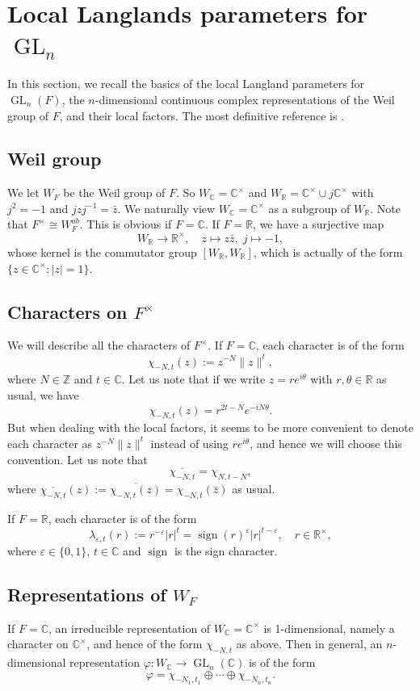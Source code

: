 \documentclass[11pt]{amsart}
\theoremstyle{plain}
\theoremstyle{definition}
\numberwithin{equation}{section}
\newcommand{\C}{\mathbb C}
\newcommand{\Z}{\mathbb{Z}}
\newcommand{\R}{\mathbb{R}}
\newcommand{\la}{\lambda}
\newcommand{\ep}{\varepsilon}
\newcommand{\sign}{\operatorname{sign}}
\newcommand{\ie}{\text{i.e.\ }}
\newcommand{\GL}{\operatorname{GL}}
\begin{document}
\section{Local Langlands parameters for $\GL_n$}


In this section, we recall the basics of the local Langland parameters
for $\GL_n(F)$, \ie the $n$-dimensional continuous complex representations of
the Weil group of $F$, and their local factors. The most definitive reference
is \cite{Tate}.

\subsection{Weil group}
We let $W_F$ be the Weil group of $F$. So $W_\C=\C^\times$ and
$W_\R=\C^\times\cup j\C^\times$ with $j^2=-1$ and
$jzj^{-1}=\bar{z}$. We naturally view $W_\C=\C^\times$ as a subgroup of
$W_\R$. Note that $F^\times\cong W_F^{ab}$. This is obvious if
$F=\C$. If $F=\R$, we have a surjective map
\begin{equation}\label{E:W_R}
W_\R\longrightarrow \R^\times, \quad z\mapsto z\bar{z},\; j\mapsto -1,
\end{equation}
whose kernel is the commutator group $[W_\R, W_\R]$, which is actually of the form
$\{z\in\C^\times:|z|=1\}$.


\subsection{Characters on $F^\times$}
We will describe all the characters of $F^\times$. If $F=\C$,
each character is of the form 
\[
\chi_{-N, t}(z):=z^{-N}\|z\|^t,
\]
where $N\in\Z$ and $t\in\C$.  Let us note that if we write $z=re^{i\theta}$ with $r,
\theta\in\R$ as usual, we have
\[
\chi_{-N,t}(z)=r^{2t-N}e^{-iN\theta}.
\]
But when dealing with the local factors, it seems to be more
convenient to denote each character as $z^{-N}\|z\|^t$ instead of
using $re^{i\theta}$, and hence we
will choose this convention.
Let us note that
\[
\overline{\chi_{-N,t}}=\chi_{N, t-N},
\]
where $\overline{\chi_{-N,t}}(z):=\overline{\chi_{-N,t}(z)}=\chi_{-N,t}(\bar{z})$ as usual.

If $F=\R$, each character is of the form
\[
\la_{\ep, t}(r):=r^{-\ep}|r|^t=\sign(r)^{\ep}|r|^{t-\ep},\quad r\in\R^\times,
\]
where $\ep\in\{0,1\}$, $t\in\C$ and $\sign$ is the sign character.

\subsection{Representations of $W_F$}
If $F=\C$, an irreducible representation
of $W_\C=\C^\times$ is 1-dimensional, namely a character on
$\C^\times$, and hence of the form $\chi_{-N,t}$ as above. Then in
general, an $n$-dimensional representation
$\varphi:W_\C\rightarrow\GL_n(\C)$ is of the form
\begin{equation}\label{E:general_parameter_C}
\varphi=\chi_{-N_1,t_1}\oplus\cdots\oplus\chi_{-N_n, t_n}.
\end{equation}
\end{document}
